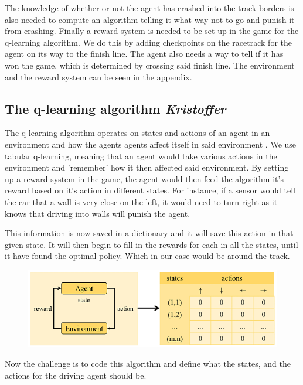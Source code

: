 The knowledge of whether or not the agent has crashed into the track borders is also needed to compute an algorithm telling it what way not to go and punish it from crashing. Finally a reward system is needed to be set up in the game for the q-learning algorithm. We do this by adding checkpoints on the racetrack for the agent on its way to the finish line. The agent also needs a way to tell if it has won the game, which is determined by crossing said finish line. 
The environment and the reward system can be seen in the appendix.
\subsection{The q-learning algorithm \small\textit{Kristoffer}}
\vspace{3mm}
The q-learning algorithm operates on states and actions of an agent in an environment and how the agents agents affect itself in said environment . 
We use tabular q-learning, meaning that an agent would take various actions in the environment and 'remember' how it then affected said environment. By setting up a reward system in the game, the agent would then feed the algorithm it's reward based on it's action in different states. For instance, if a sensor would tell the car that a wall is very close on the left, it would need to turn right as it knows that driving into walls will punish the agent. 

This information is now saved in a dictionary and it will save this action in that given state. It will then begin to fill in the rewards for each in all the states, until it have found the optimal policy. Which in our case would be around the track.

\begin{figure}[H] \centering
\includegraphics[scale=0.5]{Billeder/tabular-qlearning.png}\\
\caption*{}
\end{figure}

Now the challenge is to code this algorithm and define what the states, and the actions for the driving agent should be.


